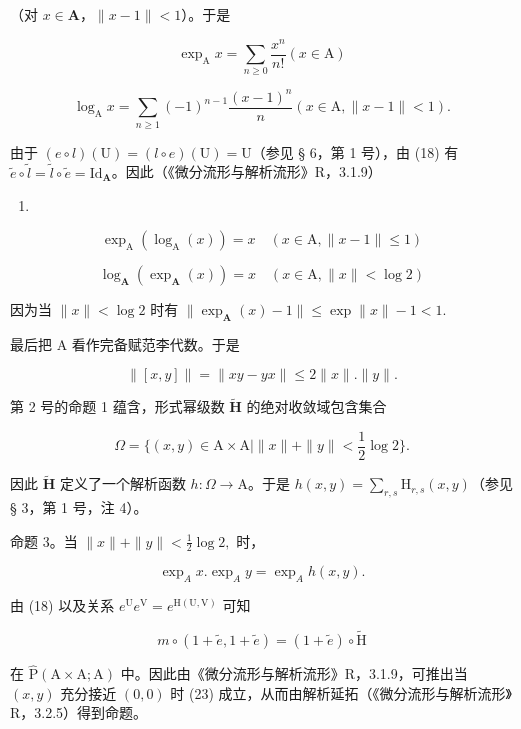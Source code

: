 （对 \(x \in \mathbf{A}\)，\(\| x - 1\| < 1\)）。于是

\[
\exp_ {\mathrm{A}} x = \sum_ {n \geqslant 0} \frac {x ^ {n}}{n !} (x \in \mathrm{A})\tag{19}
\]

\[
\log_ {\mathrm{A}} x = \sum_ {n \geqslant 1} (- 1) ^ {n - 1} \frac {(x - 1) ^ {n}}{n} (x \in \mathrm{A}, \| x - 1 \| <   1).\tag{20}
\]

由于 \((e\circ l)(\mathrm{U}) = (l\circ e)(\mathrm{U}) = \mathrm{U}\)（参见 § 6，第 1 号），由 (18) 有 \(\tilde{e}\circ \tilde{l} = \tilde{l}\circ \tilde{e} = \mathrm{Id}_{\mathbf{A}}\)。因此（《微分流形与解析流形》R，3.1.9）

\begin{enumerate}
\def\labelenumi{(\arabic{enumi})}
\setcounter{enumi}{20}
\tightlist
\item
\end{enumerate}

\[
\exp_ {\mathrm{A}} (\log_ {\mathrm{A}} (x)) = x \quad (x \in \mathrm{A}, \| x - 1 \| \leqslant 1)\tag{21}
\]

\[
\log_ {\mathbf {A}} (\exp_ {\mathbf {A}} (x)) = x \quad (x \in \mathrm{A}, \| x \| <   \log 2)\tag{22}
\]

因为当 \(\| x\| < \log 2\) 时有 \(\| \exp_{\mathbf{A}}(x) - 1\| \leqslant \exp \| x\| -1 < 1.\)

最后把 A 看作完备赋范李代数。于是

\[
\| [ x, y ] \| = \| x y - y x \| \leqslant 2 \| x \|. \| y \|.
\]

第 2 号的命题 1 蕴含，形式幂级数 \(\tilde{\mathbf{H}}\) 的绝对收敛域包含集合

\[
\Omega = \{(x, y) \in \mathrm{A} \times \mathrm{A} | \| x \| + \| y \| <   \frac {1}{2} \log 2 \}.
\]

因此 \(\tilde{\mathbf{H}}\) 定义了一个解析函数 \(h\colon \Omega \to \mathrm{A}\)。于是 \(h(x,y) = \sum_{r,s}\mathrm{H}_{r,s}(x,y)\)（参见 § 3，第 1 号，注 4）。

命题 3。当 \(\| x\| + \| y\| < \frac{1}{2}\log 2,\) 时，

\[
\exp_ {A} x. \exp_ {A} y = \exp_ {A} h (x, y).\tag{23}
\]

由 (18) 以及关系 \(e^{\mathrm{U}}e^{\mathrm{V}} = e^{\mathrm{H}(\mathrm{U},\mathrm{V})}\) 可知

\[
m \circ (1 + \tilde {e}, 1 + \tilde {e}) = (1 + \tilde {e}) \circ \tilde {\mathrm{H}}
\]

在 \(\hat{\mathrm{P}} (\mathrm{A}\times \mathrm{A};\mathrm{A})\) 中。因此由《微分流形与解析流形》R，3.1.9，可推出当 \((x,y)\) 充分接近 \((0,0)\) 时 (23) 成立，从而由解析延拓（《微分流形与解析流形》R，3.2.5）得到命题。

